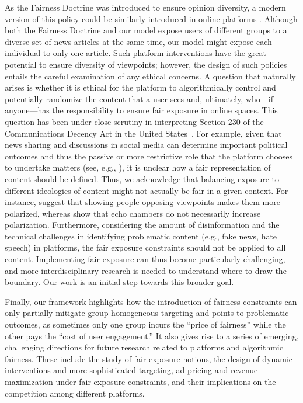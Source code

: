 \documentclass[letterpaper]{article} %
\begin{document}
As the Fairness Doctrine was introduced to ensure opinion diversity, a modern version of this policy could be similarly introduced in online platforms \citep{WP_FairnessDoctrine_2021}.
Although both the Fairness Doctrine and our model expose users of different groups to a diverse set of news articles at the same time, our model might expose each individual to only one article.
Such platform interventions have the great potential to ensure diversity of viewpoints; however, the design of such policies entails the careful examination of any ethical concerns.
A question that naturally arises is whether it is ethical for the platform to algorithmically control and potentially randomize the content that a user sees and, ultimately, who---if anyone---has the responsibility to ensure fair exposure in online spaces.
This question has been under close scrutiny in interpreting Section 230 of the Communications Decency Act in the United States~\citep{sec230}.
For example, given that news sharing and discussions in social media can determine important political outcomes and thus the passive or more restrictive role that the platform chooses to undertake matters (see, e.g., \citet{BBC_Trump, FB_NYT2020}), it is unclear how a fair representation of content should be defined.
Thus, we acknowledge that balancing exposure to different ideologies of content might not actually be fair in a given context.
For instance, \citet{Bail9216} suggest that showing people opposing viewpoints makes them more polarized, whereas \citet{Becker10717} show that echo chambers do not necessarily increase polarization.
Furthermore, considering the amount of disinformation and the technical challenges in identifying problematic content (e.g.,  fake news, hate speech) in platforms, the fair exposure constraints should not be applied to all content.
Implementing fair exposure can thus become particularly challenging, and more interdisciplinary research is needed to understand where to draw the boundary.
Our work is an initial step towards this broader goal.

Finally, our framework highlights how the introduction of fairness constraints can only partially mitigate group-homogeneous targeting and points to problematic outcomes, as sometimes only one group incurs the ``price of fairness'' while the other pays the ``cost of user engagement.''
It also gives rise to a series of emerging, challenging directions for future research related to platforms and algorithmic fairness.
These include the study of fair exposure notions, the design of dynamic interventions and more sophisticated targeting, ad pricing and revenue maximization under fair exposure constraints, and their implications on the competition among different platforms.
\end{document}
